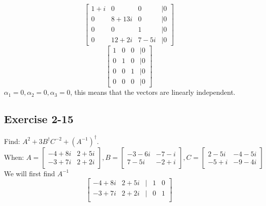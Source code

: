 \documentclass{article}
\begin{document}
            \[
                \begin{bmatrix}
                    1 + i & 0 & 0 & | 0\\
                    0 & 8+13i & 0 & | 0\\
                    0 & 0 & 1 & | 0\\
                    0 & 12+2i & 7-5i & | 0
                \end{bmatrix}
            \]
            \[
                \begin{bmatrix}
                    1 & 0 & 0 & | 0\\
                    0 & 1 & 0 & | 0\\
                    0 & 0 & 1 & | 0\\
                    0 & 0 & 0 & | 0
                \end{bmatrix}
            \]
            $\alpha_1 = 0,\alpha_2 = 0,\alpha_3 = 0$, this means that the vectors are linearly independent.

            
        \subsection*{Exercise 2-15}
            Find: $A^2 + 3B^{\dagger}C^{-2} + (A^{-1})^{\dagger}$.
            \[
                \text{When: }
                A=\left[\begin{matrix}-4 + 8 i & 2 + 5 i\\-3 + 7 i & 2 + 2 i\end{matrix}\right], B=\left[\begin{matrix}-3 - 6 i & -7 - i\\7 - 5 i & -2 + i\end{matrix}\right], C=\left[\begin{matrix}2 - 5 i & -4 - 5 i\\-5 + i & -9 - 4 i\end{matrix}\right]
            \]
            We will first find $A^{-1}$
            \[
                \begin{bmatrix}
                    -4 + 8 i & 2 + 5 i & | & 1 & 0\\
                    -3 + 7 i & 2 + 2 i & | & 0 & 1\\
                \end{bmatrix}
            \]
\end{document}
